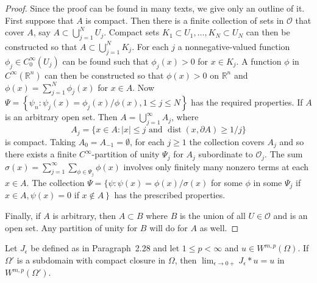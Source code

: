 \begin{proof}
  Since the proof can be found in many texts, we give only an outline of it.
  First suppose that $A$ is compact. Then there is a finite collection of sets in $\mathscr{O}$ 
  that cover $A$, say $A \subset \bigcup_{j=1}^N U_j$.
  Compact sets $K_1 \subset U_1, \ldots, K_N \subset U_N$ can then be constructed so that
  $A \subset \bigcup_{j=1}^N K_j$. For each $j$ a nonnegative-valued function
  $\phi_j \in C_0^{\infty}\left(U_j\right)$ can be found such that $\phi_j(x)>0$
  for $x \in K_j$. A function $\phi$ in $C^{\infty}\left(\mathbb{R}^n\right)$ can then be constructed so that $\phi(x)>0$ on $\mathbb{R}^n$ and $\phi(x)=\sum_{j=1}^N \phi_j(x)$
  for $x \in A$. Now $\Psi=\left\{\psi_n: \psi_j(x)=\phi_j(x) / \phi(x), 1 \leq j \leq N\right\}$ 
  has the required properties.
  If $A$ is an arbitrary open set. Then $A=\bigcup_{j=1}^{\infty} A_j$, where
  \[
  A_j=\{x \in A:|x| \leq j \text { and } \operatorname{dist}(x, \partial A) \geq 1 / j\}
  \]
  is compact. Taking $A_0=A_{-1}=\emptyset$, for each $j \geq 1$ the collection
  covers $A_j$ and so there exists a finite $C^{\infty}$-partition of unity $\Psi_j$ for $A_j$ subordinate to $\mathscr{O}_j$. The sum $\sigma(x)=\sum_{j=1}^{\infty} \sum_{\phi \in \Psi_j} \phi(x)$ involves only finitely many nonzero terms at each $x \in A$. The collection $\Psi=\{\psi: \psi(x)=\phi(x) / \sigma(x)$ for some $\phi$ in some $\Psi_j$ if $x \in A, \psi(x)=0$ if $\left.x \notin A\right\}$ has the prescribed properties.
  
  Finally, if $A$ is arbitrary, then $A \subset B$ where $B$ is the union of all $U \in \mathscr{O}$ and is an open set. Any partition of unity for $B$ will do for $A$ as well.
\end{proof}

\begin{lemma}
  Let $J_\epsilon$ be defined as in Paragraph~2.28 and let $1 \leq p<\infty$ and $u \in W^{m, p}(\Omega)$. If $\Omega'$ is a subdomain with compact closure in $\Omega$, then $\lim _{\epsilon \rightarrow 0+} J_\epsilon * u=u$ in $W^{m, p}\left(\Omega'\right)$.
\end{lemma}

